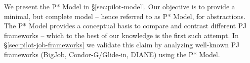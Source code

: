\documentclass[conference]{IEEEtran}
\begin{document}











We present the P* Model in \S\ref{sec:pilot-model}. Our objective is to provide
a minimal, but complete model -- hence referred to as P* Model, for \pilotjob
abstractions. The P* Model provides a conceptual basis to compare and contrast
different PJ frameworks -- which to the best of our knowledge is the first such
attempt. In \S\ref{sec:pilot-job-frameworks} we validate this claim by analyzing
well-known PJ frameworks (BigJob, Condor-G/Glide-in, DIANE) using
the P* Model.
\end{document}

